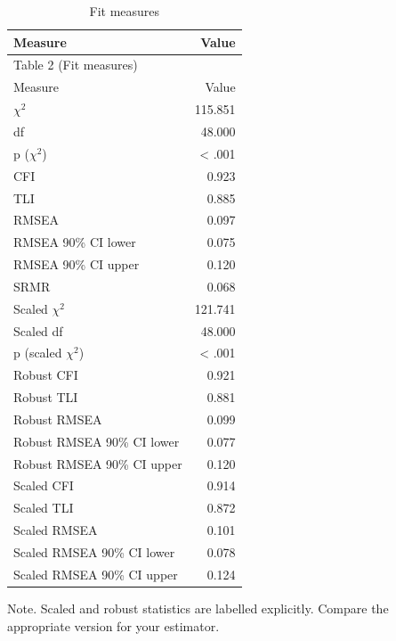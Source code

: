 \documentclass[11pt]{article}
\begin{document}
\small
\begin{longtable}{lr}
\caption{Fit measures}\\
\toprule
Measure & Value \\
\midrule
\endfirsthead
\multicolumn{2}{l}{Table 2 (Fit measures)} \\
\toprule
Measure & Value \\
\midrule
\endhead
$\chi$$^{2}$ & 115.851 \\
df & 48.000 \\
p ($\chi$$^{2}$) & < .001 \\
CFI & 0.923 \\
TLI & 0.885 \\
RMSEA & 0.097 \\
RMSEA 90\% CI lower & 0.075 \\
RMSEA 90\% CI upper & 0.120 \\
SRMR & 0.068 \\
Scaled $\chi$$^{2}$ & 121.741 \\
Scaled df & 48.000 \\
p (scaled $\chi$$^{2}$) & < .001 \\
Robust CFI & 0.921 \\
Robust TLI & 0.881 \\
Robust RMSEA & 0.099 \\
Robust RMSEA 90\% CI lower & 0.077 \\
Robust RMSEA 90\% CI upper & 0.120 \\
Scaled CFI & 0.914 \\
Scaled TLI & 0.872 \\
Scaled RMSEA & 0.101 \\
Scaled RMSEA 90\% CI lower & 0.078 \\
Scaled RMSEA 90\% CI upper & 0.124 \\
\bottomrule
\end{longtable}
\noindent Note. Scaled and robust statistics are labelled explicitly. Compare the appropriate version for your estimator.\par
\end{document}
